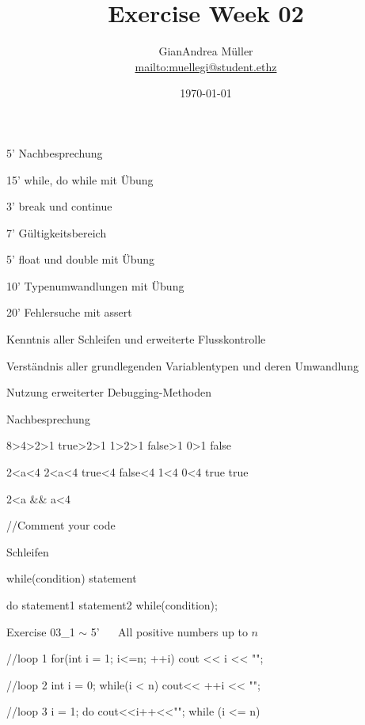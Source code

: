 \documentclass[handout,usenames,dvipsnames]{beamer}
\title{Exercise Week 02}
\author{GianAndrea Müller\\ \url{mailto:muellegi@student.ethz}}
\date{\today}
\begin{document}
\maketitle

\begin{TFTimeSchedule}
\item 5' Nachbesprechung 
\item 15' while, do while mit Übung
\item 3' break und continue
\item 7' Gültigkeitsbereich
\item 5' float und double mit Übung
\item 10' Typenumwandlungen mit Übung
\item 20' Fehlersuche mit assert
\end{TFTimeSchedule}

\begin{TFLearningObjectives}
\item Kenntnis aller Schleifen und erweiterte Flusskontrolle
\item Verständnis aller grundlegenden Variablentypen und deren Umwandlung
\item Nutzung erweiterter Debugging-Methoden
\end{TFLearningObjectives}

\begin{frame}[fragile]{Nachbesprechung}
\begin{TFCpp}
8>4>2>1
true>2>1
1>2>1
false>1
0>1
false

2<a<4     2<a<4
true<4    false<4
1<4       0<4
true      true

2<a && a<4

//Comment your code
\end{TFCpp}
\end{frame}


\begin{frame}[fragile]{Schleifen}
\begin{TFCpp}
while(condition)
	statement


do{
	statement1
	statement2
}
while(condition);
\end{TFCpp}
\end{frame}

\begin{frame}[fragile]{Exercise 03\_1 $\sim$ 5' $\quad$ All positive numbers up to $n$}
\begin{TFCpp}
//loop 1
for(int i = 1; i<=n; ++i)
	cout << i << "\n";
	
//loop 2
int i = 0;
while(i < n)
	cout<< ++i << "\n";
	
//loop 3
i = 1;
do
	cout<<i++<<"\n";
while (i <= n)
\end{TFCpp}
\end{frame}
\end{document}
